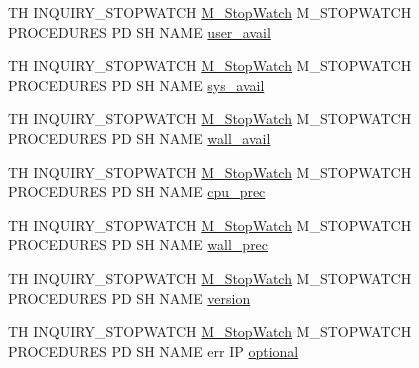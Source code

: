 \begin{DoxyCompactItemize}
\item 
TH I\+N\+Q\+U\+I\+R\+Y\+\_\+\+S\+T\+O\+P\+W\+A\+T\+CH \hyperlink{option__stopwatch_83_8txt_aa2011fc45a5e502e87ee50996a8a9305}{M\+\_\+\+Stop\+Watch} M\+\_\+\+S\+T\+O\+P\+W\+A\+T\+CH P\+R\+O\+C\+E\+D\+U\+R\+ES PD SH N\+A\+ME \hyperlink{inquiry__stopwatch_83_8txt_a302378a0fc3cc389357199927dccdc6d}{user\+\_\+avail}
\item 
TH I\+N\+Q\+U\+I\+R\+Y\+\_\+\+S\+T\+O\+P\+W\+A\+T\+CH \hyperlink{option__stopwatch_83_8txt_aa2011fc45a5e502e87ee50996a8a9305}{M\+\_\+\+Stop\+Watch} M\+\_\+\+S\+T\+O\+P\+W\+A\+T\+CH P\+R\+O\+C\+E\+D\+U\+R\+ES PD SH N\+A\+ME \hyperlink{inquiry__stopwatch_83_8txt_a1f4290ad6f2e60e1f902db8a5e86ba7b}{sys\+\_\+avail}
\item 
TH I\+N\+Q\+U\+I\+R\+Y\+\_\+\+S\+T\+O\+P\+W\+A\+T\+CH \hyperlink{option__stopwatch_83_8txt_aa2011fc45a5e502e87ee50996a8a9305}{M\+\_\+\+Stop\+Watch} M\+\_\+\+S\+T\+O\+P\+W\+A\+T\+CH P\+R\+O\+C\+E\+D\+U\+R\+ES PD SH N\+A\+ME \hyperlink{inquiry__stopwatch_83_8txt_a73da37f4d5799996a833d139d422cef8}{wall\+\_\+avail}
\item 
TH I\+N\+Q\+U\+I\+R\+Y\+\_\+\+S\+T\+O\+P\+W\+A\+T\+CH \hyperlink{option__stopwatch_83_8txt_aa2011fc45a5e502e87ee50996a8a9305}{M\+\_\+\+Stop\+Watch} M\+\_\+\+S\+T\+O\+P\+W\+A\+T\+CH P\+R\+O\+C\+E\+D\+U\+R\+ES PD SH N\+A\+ME \hyperlink{inquiry__stopwatch_83_8txt_a31483d611b443f67111f1154cd00fc7e}{cpu\+\_\+prec}
\item 
TH I\+N\+Q\+U\+I\+R\+Y\+\_\+\+S\+T\+O\+P\+W\+A\+T\+CH \hyperlink{option__stopwatch_83_8txt_aa2011fc45a5e502e87ee50996a8a9305}{M\+\_\+\+Stop\+Watch} M\+\_\+\+S\+T\+O\+P\+W\+A\+T\+CH P\+R\+O\+C\+E\+D\+U\+R\+ES PD SH N\+A\+ME \hyperlink{inquiry__stopwatch_83_8txt_a5ff5c1fe3dd4df4b4c88053f0182e09d}{wall\+\_\+prec}
\item 
TH I\+N\+Q\+U\+I\+R\+Y\+\_\+\+S\+T\+O\+P\+W\+A\+T\+CH \hyperlink{option__stopwatch_83_8txt_aa2011fc45a5e502e87ee50996a8a9305}{M\+\_\+\+Stop\+Watch} M\+\_\+\+S\+T\+O\+P\+W\+A\+T\+CH P\+R\+O\+C\+E\+D\+U\+R\+ES PD SH N\+A\+ME \hyperlink{inquiry__stopwatch_83_8txt_aee378be19d20935dd436517beda00ee4}{version}
\item 
TH I\+N\+Q\+U\+I\+R\+Y\+\_\+\+S\+T\+O\+P\+W\+A\+T\+CH \hyperlink{option__stopwatch_83_8txt_aa2011fc45a5e502e87ee50996a8a9305}{M\+\_\+\+Stop\+Watch} M\+\_\+\+S\+T\+O\+P\+W\+A\+T\+CH P\+R\+O\+C\+E\+D\+U\+R\+ES PD SH N\+A\+ME err IP \hyperlink{inquiry__stopwatch_83_8txt_ae6234c62ee65662c46e3ce6056a3f252}{optional}
\item 

\end{DoxyCompactItemize}
